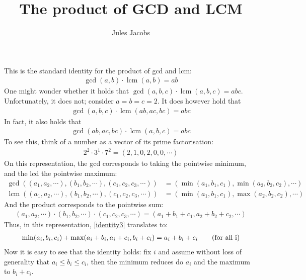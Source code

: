 

\newcommand{\tac}[1]{\lstinline[mathescape]~#1~}
\newcommand{\ciff}{\ \leftrightarrow\ }
\newcommand{\hyp}{\tac{H}}
\newcommand{\hypB}{\tac{G}}
\newcommand{\var}{\tac{x}}
\newcommand{\varB}{\tac{y}}

\newtheorem*{nlemma}{Lemma}

\DeclareMathOperator*{\tr}{tr}
\DeclareMathOperator*{\lcm}{lcm}



\title{The product of GCD and LCM}
\author{Jules Jacobs}


\maketitle

This is the standard identity for the product of gcd and lcm:
\begin{align*}
  \gcd(a,b) \cdot \lcm(a,b) = ab
\end{align*}
One might wonder whether it holds that $\gcd(a,b,c) \cdot \lcm(a,b,c) = abc$.
Unfortunately, it does not; consider $a=b=c=2$. It does however hold that
\begin{align}
  \label{identity3}
  \gcd(a,b,c) \cdot \lcm(ab,ac,bc) = abc
\end{align}
In fact, it also holds that
\begin{align*}
  \gcd(ab,ac,bc) \cdot \lcm(a,b,c) = abc
\end{align*}
To see this, think of a number as a vector of its prime factorisation:
\begin{align*}
  2^2\cdot 3^1 \cdot 7^2 = (2,1,0,2,0,0,\cdots)
\end{align*}
On this representation, the gcd corresponds to taking the pointwise minimum, and the lcd the pointwise maximum:
\begin{align*}
  \gcd((a_1,a_2,\cdots),(b_1,b_2,\cdots),(c_1,c_2,c_3,\cdots)) &= (\min(a_1,b_1,c_1), \min(a_2,b_2,c_2), \cdots)\\
  \lcm((a_1,a_2,\cdots),(b_1,b_2,\cdots),(c_1,c_2,c_3,\cdots)) &= (\min(a_1,b_1,c_1), \max(a_2,b_2,c_2), \cdots)
\end{align*}
And the product corresponds to the pointwise sum:
\begin{align*}
  (a_1,a_2,\cdots)\cdot(b_1,b_2,\cdots)\cdot(c_1,c_2,c_3,\cdots) = (a_1+b_1+c_1, a_2+b_2+c_2, \cdots)
\end{align*}
Thus, in this representation, \cref{identity3} translates to:
\begin{align*}
  \min(a_i,b_i,c_i) + \max(a_i+b_i, a_i+c_i, b_i+c_i) = a_i + b_i + c_i \text{\qquad (for all i)}
\end{align*}
Now it is easy to see that the identity holds: fix $i$ and assume without loss of generality that $a_i \leq b_i \leq c_i$,
then the minimum reduces do $a_i$ and the maximum to $b_i+c_i$.


